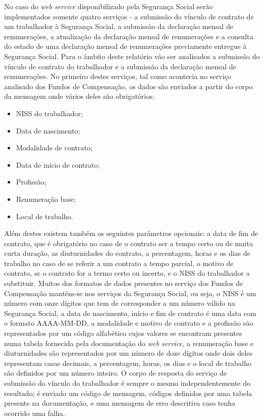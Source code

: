 \documentclass[sigplan]{acmart}
\begin{document}
No caso do \textit{web service} disponibilizado pela Segurança Social serão implementados somente quatro serviços - a submissão do vínculo de contrato de um trabalhador à Segurança Social, a submissão da declaração mensal de renumerações, a atualização da declaração mensal de renumerações e a consulta do estado de uma declaração mensal de renumerações previamente entregue à Segurança Social. Para o âmbito deste relatório vão ser analisados a submissão do vínculo de contrato do trabalhador e a submissão da declaração mensal de renumerações. No primeiro destes serviços, tal como acontecia no serviço analisado dos Fundos de Compensação, os dados são enviados a partir do corpo da mensagem onde vários deles são obrigatórios:
\begin{itemize}
  \item NISS do trabalhador;
  \item Data de nascimento;
  \item Modalidade de contrato;
  \item Data de início de contrato;
  \item Profissão;
  \item Renumeração base;
  \item Local de trabalho.
\end{itemize}
Além destes existem também os seguintes parâmetros opcionais: a data de fim de contrato, que é obrigatório no caso de o contrato ser a tempo certo ou de muita curta duração, as diuturnidades do contrato, a percentagem, horas e os dias de trabalho no caso de se referir a um contrato a tempo parcial, o motivo de contrato, se o contrato for a termo certo ou incerto, e o NISS do trabalhador a substituir. Muitos dos formatos de dados presentes no serviço dos Fundos de Compensação mantêm-se nos serviços da Segurança Social, ou seja, o NISS é um número com onze dígitos que tem de corresponder a um número válido na Segurança Social, a data de nascimento, início e fim de contrato é uma data com o formato AAAA-MM-DD, a modalidade e motivo de contrato e a profissão são representados por um código alfabético cujos valores se encontram presentes numa tabela fornecida pela documentação do \textit{web service}, a renumeração base e diuturnidades são representados por um número de doze dígitos onde dois deles representam casas decimais, a percentagem, horas, os dias e o local de trabalho são definidos por um número inteiro. O corpo de resposta do serviço de submissão do vínculo do trabalhador é sempre o mesmo independentemente do resultado; é enviado um código de mensagem, códigos definidos por uma tabela presente na documentação, e uma mensagem de erro descritiva caso tenha ocorrido uma falha.
\end{document}
